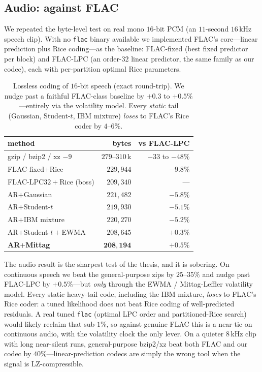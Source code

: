 \documentclass[11pt,reqno]{amsart}
\theoremstyle{plain}
\theoremstyle{definition}
\theoremstyle{remark}
\begin{document}
\subsection{Audio: against FLAC}
\label{sec:flac}

We repeated the byte-level test on real mono $16$-bit PCM (an $11$-second
$16$\,kHz speech clip). With no \texttt{flac} binary available we implemented
FLAC's core---linear prediction plus Rice coding---as the baseline:
\textsf{FLAC-fixed} (best fixed predictor per block) and \textsf{FLAC-LPC}
(an order-$32$ linear predictor, the same family as our codec), each with
per-partition optimal Rice parameters.

\begin{table}[h]
\centering\small
\begin{tabular}{lrr}
\toprule
method & bytes & vs FLAC-LPC\\
\midrule
gzip / bzip2 / xz $-9$ & $279$--$310$\,k & $-33$ to $-48\%$\\
FLAC-fixed$+$Rice      & $229{,}944$ & $-9.8\%$\\
FLAC-LPC$32+$Rice (boss)& $209{,}340$ & ---\\
AR$+$Gaussian          & $221{,}482$ & $-5.8\%$\\
AR$+$Student-$t$       & $219{,}930$ & $-5.1\%$\\
AR$+$IBM mixture       & $220{,}270$ & $-5.2\%$\\
AR$+$Student-$t+$EWMA  & $208{,}645$ & $+0.3\%$\\
\textbf{AR$+$Mittag}   & $\mathbf{208{,}194}$ & $\mathbf{+0.5\%}$\\
\bottomrule
\end{tabular}
\caption{Lossless coding of $16$-bit speech (exact round-trip). We nudge past a
faithful FLAC-class baseline by $+0.3$ to $+0.5\%$---entirely via the volatility
model. Every \emph{static} tail (Gaussian, Student-$t$, IBM mixture) \emph{loses}
to FLAC's Rice coder by $4$--$6\%$.}
\label{tab:flac}
\end{table}

The audio result is the sharpest test of the thesis, and it is sobering. On
continuous speech we beat the general-purpose zips by $25$--$35\%$ and nudge past
FLAC-LPC by $+0.5\%$---but \emph{only} through the EWMA / Mittag-Leffler
volatility model. Every static heavy-tail code, including the IBM mixture,
\emph{loses} to FLAC's Rice coder: a tuned likelihood does not beat Rice coding
of well-predicted residuals. A real tuned \texttt{flac} (optimal LPC order and
partitioned-Rice search) would likely reclaim that sub-$1\%$, so against genuine
FLAC this is a near-tie on continuous audio, with the volatility clock the only
lever. On a quieter $8$\,kHz clip with long near-silent runs, general-purpose
bzip2/xz beat both FLAC and our codec by $40\%$---linear-prediction codecs are
simply the wrong tool when the signal is LZ-compressible.
\end{document}
